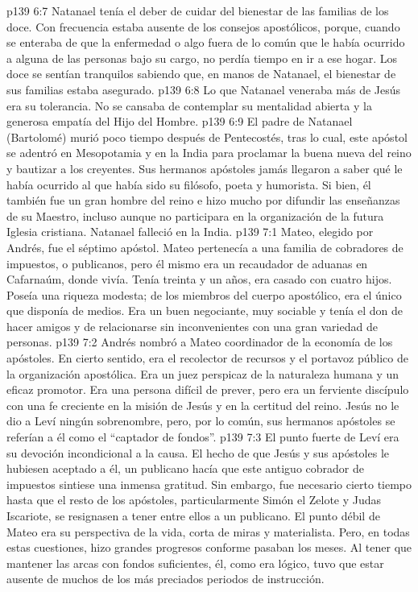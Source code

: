 \vs p139 6:7 Natanael tenía el deber de cuidar del bienestar de las familias de los doce. Con frecuencia estaba ausente de los consejos apostólicos, porque, cuando se enteraba de que la enfermedad o algo fuera de lo común que le había ocurrido a alguna de las personas bajo su cargo, no perdía tiempo en ir a ese hogar. Los doce se sentían tranquilos sabiendo que, en manos de Natanael, el bienestar de sus familias estaba asegurado.
\vs p139 6:8 \pc Lo que Natanael veneraba más de Jesús era su tolerancia. No se cansaba de contemplar su mentalidad abierta y la generosa empatía del Hijo del Hombre.
\vs p139 6:9 \pc El padre de Natanael (Bartolomé) murió poco tiempo después de Pentecostés, tras lo cual, este apóstol se adentró en Mesopotamia y en la India para proclamar la buena nueva del reino y bautizar a los creyentes. Sus hermanos apóstoles jamás llegaron a saber qué le había ocurrido al que había sido su filósofo, poeta y humorista. Si bien, él también fue un gran hombre del reino e hizo mucho por difundir las enseñanzas de su Maestro, incluso aunque no participara en la organización de la futura Iglesia cristiana. Natanael falleció en la India.
\vs p139 7:1 Mateo, elegido por Andrés, fue el séptimo apóstol. Mateo pertenecía a una familia de cobradores de impuestos, o publicanos, pero él mismo era un recaudador de aduanas en Cafarnaúm, donde vivía. Tenía treinta y un años, era casado con cuatro hijos. Poseía una riqueza modesta; de los miembros del cuerpo apostólico, era el único que disponía de medios. Era un buen negociante, muy sociable y tenía el don de hacer amigos y de relacionarse sin inconvenientes con una gran variedad de personas.
\vs p139 7:2 \pc Andrés nombró a Mateo coordinador de la economía de los apóstoles. En cierto sentido, era el recolector de recursos y el portavoz público de la organización apostólica. Era un juez perspicaz de la naturaleza humana y un eficaz promotor. Era una persona difícil de prever, pero era un ferviente discípulo con una fe creciente en la misión de Jesús y en la certitud del reino. Jesús no le dio a Leví ningún sobrenombre, pero, por lo común, sus hermanos apóstoles se referían a él como el “captador de fondos”.
\vs p139 7:3 El punto fuerte de Leví era su devoción incondicional a la causa. El hecho de que Jesús y sus apóstoles le hubiesen aceptado a él, un publicano hacía que este antiguo cobrador de impuestos sintiese una inmensa gratitud. Sin embargo, fue necesario cierto tiempo hasta que el resto de los apóstoles, particularmente Simón el Zelote y Judas Iscariote, se resignasen a tener entre ellos a un publicano. El punto débil de Mateo era su perspectiva de la vida, corta de miras y materialista. Pero, en todas estas cuestiones, hizo grandes progresos conforme pasaban los meses. Al tener que mantener las arcas con fondos suficientes, él, como era lógico, tuvo que estar ausente de muchos de los más preciados periodos de instrucción.

